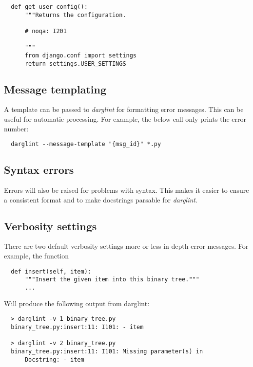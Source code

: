 \documentclass[landscape]{sciposter}
\begin{document}
\begin{multicols}{4}
\begin{verbatim}
  def get_user_config():
      """Returns the configuration.

      # noqa: I201

      """
      from django.conf import settings
      return settings.USER_SETTINGS
\end{verbatim}

        \subsection{Message templating}
            A template can be passed to \textit{darglint} for formatting error
            messages.  This can be useful for automatic processing.  For
            example, the below call only prints the error number:

\begin{verbatim}
  darglint --message-template "{msg_id}" *.py
\end{verbatim}

        \subsection{Syntax errors}
            Errors will also be raised for problems with syntax.  This
            makes it easier to ensure a consistent format and to make
            docstrings parsable for \textit{darglint}.

        \subsection{Verbosity settings}
            There are two default verbosity settings more or less in-depth
            error messages.  For example, the function
            \begin{verbatim}
  def insert(self, item):
      """Insert the given item into this binary tree."""
      ...
            \end{verbatim}

            Will produce the following output from darglint:

            \begin{verbatim}
  > darglint -v 1 binary_tree.py
  binary_tree.py:insert:11: I101: - item

  > darglint -v 2 binary_tree.py
  binary_tree.py:insert:11: I101: Missing parameter(s) in
      Docstring: - item

            \end{verbatim}



\end{multicols}
\end{document}

